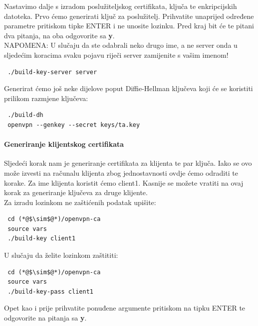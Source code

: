 Nastavimo dalje s izradom poslužiteljskog certifikata, ključa te enkripcijskih datoteka. Prvo ćemo generirati ključ za poslužitelj. Prihvatite unaprijed određene parametre pritiskom tipke ENTER i ne unosite lozinku. Pred kraj bit će te pitani dva pitanja, na oba odgovorite sa \textbf{y}.\\
NAPOMENA: U slučaju da ste odabrali neko drugo ime, a ne server onda u sljedećim koracima svaku pojavu riječi server zamijenite s vašim imenom! 
\begin{lstlisting}
 ./build-key-server server
\end{lstlisting}
Generirat ćemo još neke dijelove poput Diffie-Hellman ključeva koji će se koristiti prilikom razmjene ključeva:
\begin{lstlisting}
 ./build-dh
 openvpn --genkey --secret keys/ta.key
\end{lstlisting}

\bigbreak
\paragraph*{Generiranje klijentskog certifikata}
\hfill \smallbreak
Sljedeći korak nam je generiranje certifikata za klijenta te par ključa. Iako se ovo može izvesti na računalu klijenta zbog jednostavnosti ovdje ćemo odraditi te korake. Za ime klijenta koristit ćemo client1. Kasnije se možete vratiti na ovaj korak za generiranje ključeva za druge klijente.\\
Za izradu lozinkom ne zaštićenih podatak upišite:

\begin{lstlisting}
 cd (*@$\sim$@*)/openvpn-ca
 source vars
 ./build-key client1
\end{lstlisting}
U slučaju da želite lozinkom zaštititi:  
\begin{lstlisting}
 cd (*@$\sim$@*)/openvpn-ca
 source vars
 ./build-key-pass client1
\end{lstlisting}
Opet kao i prije prihvatite ponuđene argumente pritiskom na tipku ENTER te odgovorite na pitanja sa \textbf{y}.
\bigbreak
